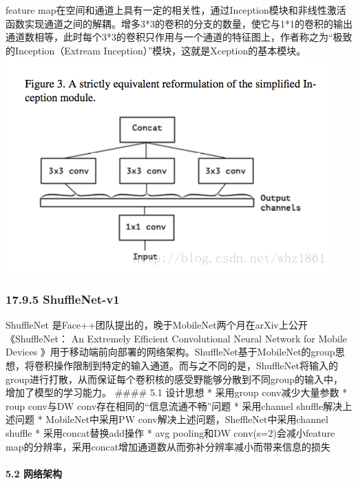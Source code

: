 feature
map在空间和通道上具有一定的相关性，通过Inception模块和非线性激活函数实现通道之间的解耦。增多3*3的卷积的分支的数量，使它与1*1的卷积的输出通道数相等，此时每个3*3的卷积只作用与一个通道的特征图上，作者称之为``极致的Inception（Extream
Inception）''模块，这就是Xception的基本模块。
\includegraphics{./img/ch17/21.png}

\subsubsection{17.9.5 ShuffleNet-v1}\label{shufflenet-v1}

ShuffleNet
是Face++团队提出的，晚于MobileNet两个月在arXiv上公开《ShuffleNet： An
Extremely Efficient Convolutional Neural Network for Mobile Devices
》用于移动端前向部署的网络架构。ShuffleNet基于MobileNet的group思想，将卷积操作限制到特定的输入通道。而与之不同的是，ShuffleNet将输入的group进行打散，从而保证每个卷积核的感受野能够分散到不同group的输入中，增加了模型的学习能力。
\#\#\#\# 5.1 设计思想 * 采用group conv减少大量参数 * roup conv与DW
conv存在相同的``信息流通不畅''问题 * 采用channel shuffle解决上述问题 *
MobileNet中采用PW conv解决上述问题，SheffleNet中采用channel shuffle *
采用concat替换add操作 * avg pooling和DW conv(s=2)会减小feature
map的分辨率，采用concat增加通道数从而弥补分辨率减小而带来信息的损失

\paragraph{5.2 网络架构}\label{ux7f51ux7edcux67b6ux6784-2}

